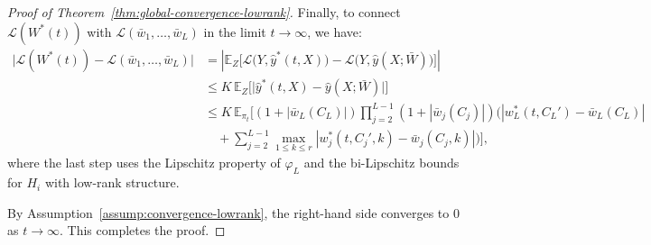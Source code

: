 \documentclass[11pt]{article}
\newcommand{\E}{\mathbb{E}}
\newcommand{\1}{\mathbbm{1}}
\begin{document}
\begin{proof}[Proof of Theorem~\ref{thm:global-convergence-lowrank}]
Finally, to connect $\mathscr{L}(W^*(t))$ with $\mathscr{L}(\bar{w}_1,\ldots,\bar{w}_L)$ in the limit $t\to\infty$, we have:
\begin{align*}
\big|\mathscr{L}(W^*(t))-\mathscr{L}(\bar{w}_1,\ldots,\bar{w}_L)\big| &= \left|\E_Z\big[\mathcal{L}\big(Y,\hat y^*(t,X)\big)-\mathcal{L}\big(Y,\hat y(X;\bar{W})\big)\big]\right|\\
&\le K\,\E_Z\big[\big|\hat y^*(t,X)-\hat y(X;\bar{W})\big|\big]\\
&\le K\,\E_{\pi_t}\Big[(1+|\bar{w}_L(C_L)|)\prod_{j=2}^{L-1}(1+|\bar{w}_j(C_j)|)\Big(|w_L^*(t,C_L')-\bar{w}_L(C_L)|\\
&\quad + \sum_{j=2}^{L-1}\max_{1\le k\le r}|w_j^*(t,C_j',k)-\bar{w}_j(C_j,k)|\Big)\Big],
\end{align*}
where the last step uses the Lipschitz property of $\varphi_L$ and the bi-Lipschitz bounds for $H_i$ with low-rank structure.

By Assumption~\ref{assump:convergence-lowrank}, the right-hand side converges to $0$ as $t\to\infty$. This completes the proof.
\end{proof}
\end{document}
